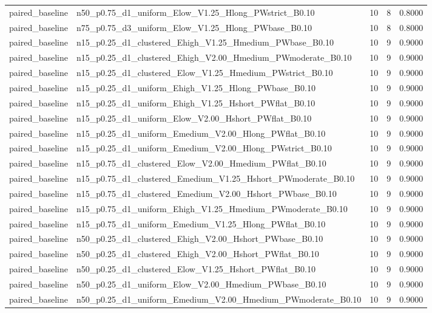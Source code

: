 \begin{tabular}{llrrr}
paired_baseline & n50_p0.75_d1_uniform_Elow_V1.25_Hlong_PWstrict_B0.10 & 10 & 8 & 0.8000 \\
paired_baseline & n75_p0.75_d3_uniform_Elow_V1.25_Hlong_PWbase_B0.10 & 10 & 8 & 0.8000 \\
paired_baseline & n15_p0.25_d1_clustered_Ehigh_V1.25_Hmedium_PWbase_B0.10 & 10 & 9 & 0.9000 \\
paired_baseline & n15_p0.25_d1_clustered_Ehigh_V2.00_Hmedium_PWmoderate_B0.10 & 10 & 9 & 0.9000 \\
paired_baseline & n15_p0.25_d1_clustered_Elow_V1.25_Hmedium_PWstrict_B0.10 & 10 & 9 & 0.9000 \\
paired_baseline & n15_p0.25_d1_uniform_Ehigh_V1.25_Hlong_PWbase_B0.10 & 10 & 9 & 0.9000 \\
paired_baseline & n15_p0.25_d1_uniform_Ehigh_V1.25_Hshort_PWflat_B0.10 & 10 & 9 & 0.9000 \\
paired_baseline & n15_p0.25_d1_uniform_Elow_V2.00_Hshort_PWflat_B0.10 & 10 & 9 & 0.9000 \\
paired_baseline & n15_p0.25_d1_uniform_Emedium_V2.00_Hlong_PWflat_B0.10 & 10 & 9 & 0.9000 \\
paired_baseline & n15_p0.25_d1_uniform_Emedium_V2.00_Hlong_PWstrict_B0.10 & 10 & 9 & 0.9000 \\
paired_baseline & n15_p0.75_d1_clustered_Elow_V2.00_Hmedium_PWflat_B0.10 & 10 & 9 & 0.9000 \\
paired_baseline & n15_p0.75_d1_clustered_Emedium_V1.25_Hshort_PWmoderate_B0.10 & 10 & 9 & 0.9000 \\
paired_baseline & n15_p0.75_d1_clustered_Emedium_V2.00_Hshort_PWbase_B0.10 & 10 & 9 & 0.9000 \\
paired_baseline & n15_p0.75_d1_uniform_Ehigh_V1.25_Hmedium_PWmoderate_B0.10 & 10 & 9 & 0.9000 \\
paired_baseline & n15_p0.75_d1_uniform_Emedium_V1.25_Hlong_PWflat_B0.10 & 10 & 9 & 0.9000 \\
paired_baseline & n50_p0.25_d1_clustered_Ehigh_V2.00_Hshort_PWbase_B0.10 & 10 & 9 & 0.9000 \\
paired_baseline & n50_p0.25_d1_clustered_Ehigh_V2.00_Hshort_PWflat_B0.10 & 10 & 9 & 0.9000 \\
paired_baseline & n50_p0.25_d1_clustered_Elow_V1.25_Hshort_PWflat_B0.10 & 10 & 9 & 0.9000 \\
paired_baseline & n50_p0.25_d1_uniform_Elow_V2.00_Hmedium_PWbase_B0.10 & 10 & 9 & 0.9000 \\
paired_baseline & n50_p0.25_d1_uniform_Emedium_V2.00_Hmedium_PWmoderate_B0.10 & 10 & 9 & 0.9000 \\

\end{tabular}
